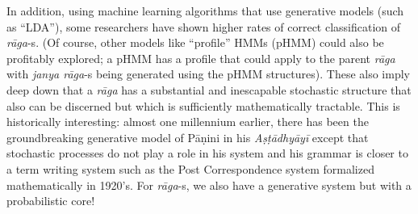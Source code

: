In addition, using machine learning algorithms that use generative models (such as “LDA”), some researchers have shown higher rates of correct classification of \textsl{rāga}-s. (Of course, other models like “profile” HMMs (pHMM) could also be profitably explored; a pHMM has a profile that could apply to the parent \textsl{rāga} with \textsl{janya rāga}-s being generated using the pHMM structures). These also imply deep down that a \textsl{rāga} has a substantial and inescapable stochastic structure that also can be discerned but which is sufficiently mathematically tractable. This is historically interesting: almost one millennium earlier, there has been the groundbreaking generative model of Pāṇini in his \textsl{Aṣṭādhyāyī} except that stochastic processes do not play a role in his system and his grammar is closer to a term writing system such as the Post Correspondence system formalized mathematically in 1920’s. For \textsl{rāga}-s, we also have a generative system but with a probabilistic core!

\newpage

